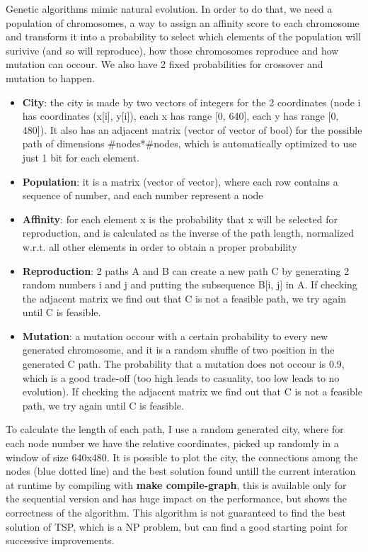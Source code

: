 \documentclass{article}
\begin{document}
        Genetic algorithms mimic natural evolution. In order to do that, we need a population of chromosomes, a way to assign an affinity score to each chromosome and transform it into a probability to select which elements of the population will surivive (and so will reproduce), how those chromosomes reproduce and how mutation can occour. We also have 2 fixed probabilities for crossover and mutation to happen.
	\begin{itemize}
	    \item \textbf{City}: the city is made by two vectors of integers for the 2 coordinates (node i has coordinates (x[i], y[i]), each x has range [0, 640], each y has range [0, 480]). It also has an adjacent matrix (vector of vector of bool) for the possible path of dimensions \#nodes*\#nodes, which is automatically optimized to use just 1 bit for each element.
	    \item \textbf{Population}: it is a matrix (vector of vector), where each row contains a sequence of number, and each number represent a node
	    \item \textbf{Affinity}: for each element x is the probability that x will be selected for reproduction, and is calculated as the inverse of the path length, normalized w.r.t. all other elements in order to obtain a proper probability
	    \item \textbf{Reproduction}: 2 paths A and B can create a new path C by generating 2 random numbers i and j and putting the subsequence B[i, j] in A. If checking the adjacent matrix we find out that C is not a feasible path, we try again until C is feasible.
	    \item \textbf{Mutation}: a mutation occour with a certain probability to every new generated chromosome, and it is a random shuffle of two position in the generated C path. The probability that a mutation does not occour is 0.9, which is a good trade-off (too high leads to casuality, too low leads to no evolution). If checking the adjacent matrix we find out that C is not a feasible path, we try again until C is feasible.
	\end{itemize}
	To calculate the length of each path, I use a random generated city, where for each node number we have the relative coordinates, picked up randomly in a window of size 640x480. It is possible to plot the city, the connections among the nodes (blue dotted line) and the best solution found untill the current interation at runtime by compiling with \textbf{make compile-graph}, this is available only for the sequential version and has huge impact on the performance, but shows the correctness of the algorithm. This algorithm is not guaranteed to find the best solution of TSP, which is a NP problem, but can find a good starting point for successive improvements.
\end{document}
